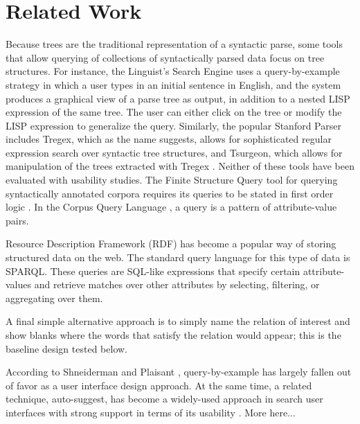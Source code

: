 
\section{Related Work}

Because trees are the traditional representation of a syntactic parse, some  tools that allow querying of  collections of syntactically parsed data focus on tree structures.   For instance, the Linguist's Search Engine \cite{resnik2005web} uses a query-by-example strategy in which a user types in an initial sentence in English, and the system produces a graphical view of a parse tree as output, in addition to a nested LISP expression of the same tree.  The user can either click on the tree or modify the LISP expression to generalize the query.    Similarly, the popular Stanford Parser includes Tregex, which as the name suggests,  allows for sophisticated regular expression search over syntactic tree structures, and Tsurgeon, which allows for manipulation of the trees extracted with Tregex \cite{levy2006tregex}.  Neither of these tools have been evaluated with usability studies.  The Finite Structure Query tool for querying syntactically annotated corpora requires its queries to be stated in first order logic \cite{kepser2003finite}. In the Corpus Query Language \cite{jakubicek2010fast}, a query is a pattern of attribute-value pairs.

Resource Description Framework (RDF) has become a popular way of storing structured data on the web. The standard query language for this type of data is SPARQL. These queries are SQL-like expressions that specify certain attribute-values and retrieve matches over other attributes by selecting, filtering, or aggregating over them.

A final simple alternative approach is to simply name the relation of interest and show blanks where the words that satisfy the relation would appear; this is the baseline design tested below.

According to Shneiderman and Plaisant \cite{shneiderman2010designing}, query-by-example has largely fallen out of favor as a user interface design approach.  At the same time, a related technique, auto-suggest, has become a widely-used approach in search user interfaces with strong support in terms of its usability \cite{hearst2009search}.  More here...
